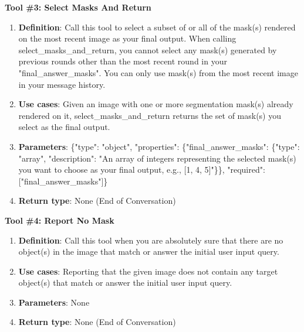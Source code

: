 \documentclass[]{fairmeta}
\begin{document}
\vspace{0.5em}
\begin{onebox}{\normalfont\bfseries Tool \#3: Select Masks And Return}
	\small
	\begin{enumerate}
		\item[(1)] \textbf{Definition}: Call this tool to select a subset of or all of the mask(s) rendered on the most recent image as your final output. When calling select\_masks\_and\_return, you cannot select any mask(s) generated by previous rounds other than the most recent round in your "final\_answer\_masks". You can only use mask(s) from the most recent image in your message history.
		\item[(2)] \textbf{Use cases}: Given an image with one or more segmentation mask(s) already rendered on it, select\_masks\_and\_return returns the set of mask(s) you select as the final output.
		\item[(3)] \textbf{Parameters}: \{"type": "object", "properties": \{"final\_answer\_masks": \{"type": "array", "description": "An array of integers representing the selected mask(s) you want to choose as your final output, e.g., [1, 4, 5]"\}\}, "required": ["final\_answer\_masks"]\}
		\item[(4)] \textbf{Return type}: None (End of Conversation)
	\end{enumerate}
\end{onebox}

\vspace{0.5em}
\begin{onebox}{\normalfont\bfseries Tool \#4: Report No Mask}
	\small
	\begin{enumerate}
		\item[(1)] \textbf{Definition}: Call this tool when you are absolutely sure that there are no object(s) in the image that match or answer the initial user input query.
		\item[(2)] \textbf{Use cases}: Reporting that the given image does not contain any target object(s) that match or answer the initial user input query.
		\item[(3)] \textbf{Parameters}: None
		\item[(4)] \textbf{Return type}: None (End of Conversation)
	\end{enumerate}
\end{onebox}
\end{document}
